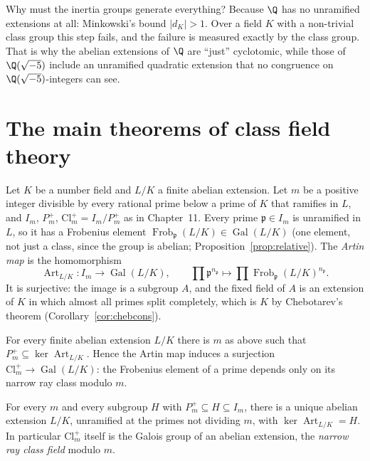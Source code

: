 \begin{think}
Why must the inertia groups generate everything? Because $\Q$ has no unramified extensions at all: Minkowski's bound $|d_K|>1$. Over a
field $K$ with a non-trivial class group this step fails, and the failure is measured exactly by the class group. That is why the
abelian extensions of $\Q$ are ``just'' cyclotomic, while those of $\Q(\sqrt{-5})$ include an unramified quadratic extension that no
congruence on $\Q(\sqrt{-5})$-integers can see.
\end{think}

\section{The main theorems of class field theory}

Let $K$ be a number field and $L/K$ a finite abelian extension. Let $m$ be a positive integer divisible by every rational prime below a
prime of $K$ that ramifies in $L$, and $I_m$, $P_m^+$, $\mathrm{Cl}_m^+=I_m/P_m^+$ as in Chapter~11. Every prime $\mathfrak p\in I_m$ is unramified in $L$,
so it has a Frobenius element $\operatorname{Frob}_{\mathfrak p}(L/K)\in\operatorname{Gal}(L/K)$ (one element, not just a class, since the group is abelian;
Proposition~\ref{prop:relative}). The \emph{Artin map} is the homomorphism
\[
\operatorname{Art}_{L/K}:I_m\to\operatorname{Gal}(L/K),\qquad\prod\mathfrak p^{n_{\mathfrak p}}\mapsto\prod\operatorname{Frob}_{\mathfrak p}(L/K)^{n_{\mathfrak p}}.
\]
It is surjective: the image is a subgroup $A$, and the fixed field of $A$ is an extension of $K$ in which almost all primes split completely,
which is $K$ by Chebotarev's theorem (Corollary~\ref{cor:chebcons}).

\begin{theorem}\label{thm:artin}
For every finite abelian extension $L/K$ there is $m$ as above such that $P_m^+\subseteq\ker\operatorname{Art}_{L/K}$. Hence the Artin map induces a
surjection $\mathrm{Cl}_m^+\to\operatorname{Gal}(L/K)$: the Frobenius element of a prime depends only on its narrow ray class modulo $m$.
\end{theorem}

\begin{theorem}\label{thm:cftexistence}
For every $m$ and every subgroup $H$ with $P_m^+\subseteq H\subseteq I_m$, there is a unique abelian extension $L/K$, unramified at the primes not dividing $m$,
with $\ker\operatorname{Art}_{L/K}=H$. In particular $\mathrm{Cl}_m^+$ itself is the Galois group of an abelian extension, the \emph{narrow ray class field}
modulo $m$.
\end{theorem}

